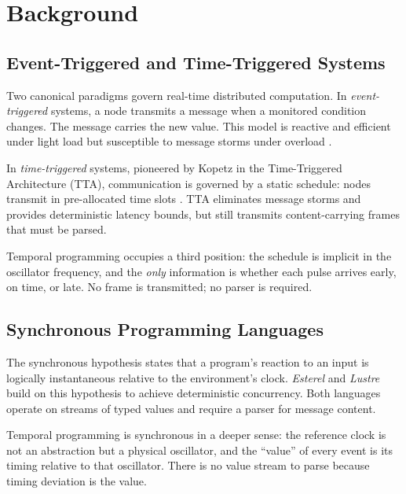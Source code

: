 \documentclass[twocolumn,10pt]{article}
\begin{document}
\section{Background}
\label{sec:background}

\subsection{Event-Triggered and Time-Triggered Systems}

Two canonical paradigms govern real-time distributed computation.
In \emph{event-triggered} systems, a node transmits a message when
a monitored condition changes. The message carries the new value.
This model is reactive and efficient under light load but susceptible
to message storms under overload \cite{kopetz2003tta}.

In \emph{time-triggered} systems, pioneered by Kopetz in the
Time-Triggered Architecture (TTA), communication is governed by a
static schedule: nodes transmit in pre-allocated time slots
\cite{kopetz2003tta,kopetz2011rts}. TTA eliminates message storms
and provides deterministic latency bounds, but still transmits
content-carrying frames that must be parsed.

Temporal programming occupies a third position: the schedule is
implicit in the oscillator frequency, and the \emph{only} information
is whether each pulse arrives early, on time, or late. No frame is
transmitted; no parser is required.

\subsection{Synchronous Programming Languages}

The synchronous hypothesis \cite{berry1992esterel} states that a
program's reaction to an input is logically instantaneous relative
to the environment's clock. \emph{Esterel} \cite{berry1992esterel}
and \emph{Lustre} \cite{halbwachs1991lustre} build on this hypothesis
to achieve deterministic concurrency. Both languages operate on streams
of typed values and require a parser for message content.

Temporal programming is synchronous in a deeper sense: the reference
clock is not an abstraction but a physical oscillator, and the
``value'' of every event is its timing relative to that oscillator.
There is no value stream to parse because timing deviation is the
value.
\end{document}

